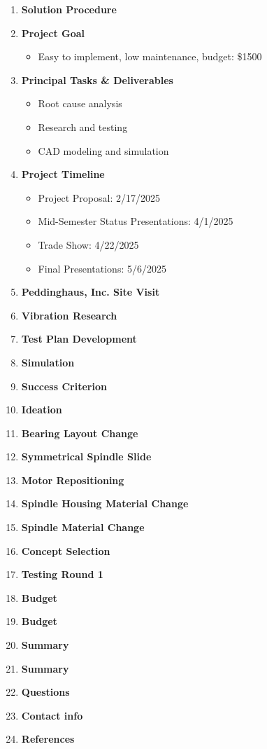 \documentclass[9pt]{article}
\theoremstyle{definition} %
\theoremstyle{plain} %
\begin{document}
\begin{enumerate}
    \item \textbf{Solution Procedure}

    \item \textbf{Project Goal}
    \begin{itemize}
        \item Easy to implement, low maintenance, budget: \$1500
    \end{itemize}

    \item \textbf{Principal Tasks \& Deliverables}
    \begin{itemize}
        \item Root cause analysis
        \item Research and testing
        \item CAD modeling and simulation
    \end{itemize}

    \item \textbf{Project Timeline}
    \begin{itemize}
        \item Project Proposal: 2/17/2025
        \item Mid-Semester Status Presentations: 4/1/2025
        \item Trade Show: 4/22/2025
        \item Final Presentations: 5/6/2025
    \end{itemize}

    \item \textbf{Peddinghaus, Inc. Site Visit}
    \item \textbf{Vibration Research}
    \item \textbf{Test Plan Development} 
    \item \textbf{Simulation}
    \item \textbf{Success Criterion}  
    \item \textbf{Ideation}  
    \item \textbf{Bearing Layout Change}
    \item \textbf{Symmetrical Spindle Slide}
    \item \textbf{Motor Repositioning}
    \item \textbf{Spindle Housing Material Change}
    \item \textbf{Spindle Material Change}
    \item \textbf{Concept Selection}
    \item \textbf{Testing Round 1}
    \item \textbf{Budget}
    \item \textbf{Budget}
    \item \textbf{Summary}
    \item \textbf{Summary}
    \item \textbf{Questions}
    \item \textbf{Contact info}
    \item \textbf{References}
    

\end{enumerate}
\end{document}

